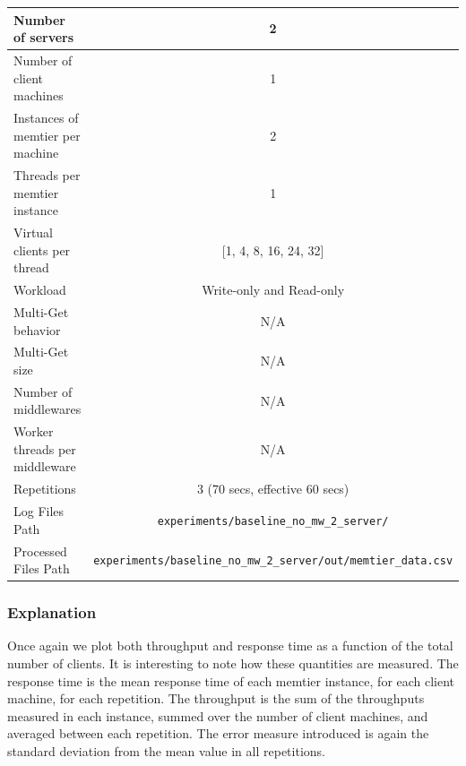 \documentclass[11pt,a4paper]{article}
\begin{document}
\begin{center}
	\scriptsize{
		\begin{tabular}{|l|c|}
			\hline Number of servers                & 2                        \\ 
			\hline Number of client machines        & 1                        \\ 
			\hline Instances of memtier per machine & 2                        \\ 
			\hline Threads per memtier instance     & 1                        \\
            \hline Virtual clients per thread       & [1, 4, 8, 16, 24, 32]    \\ 
			\hline Workload                         & Write-only and Read-only \\
			\hline Multi-Get behavior               & N/A                      \\
			\hline Multi-Get size                   & N/A                      \\
			\hline Number of middlewares            & N/A                      \\
			\hline Worker threads per middleware    & N/A                      \\
            \hline Repetitions                      & 3 (70 secs, effective 60 secs) \\ 
            \hline Log Files Path                   & \texttt{experiments/baseline\_no\_mw\_2\_server/} \\
            \hline Processed Files Path             & \texttt{experiments/baseline\_no\_mw\_2\_server/out/memtier\_data.csv}\\
			\hline 
		\end{tabular}
	} 
\end{center}

\subsubsection{Explanation}

Once again we plot both throughput and response time as a function of the total number of clients. It is interesting to note how these quantities are measured. The response time is the mean response time of each memtier instance, for each client machine, for each repetition. The throughput is the sum of the throughputs measured in each instance, summed over the number of client machines, and averaged between each repetition. The error measure introduced is again the standard deviation from the mean value in all repetitions.
\end{document}
